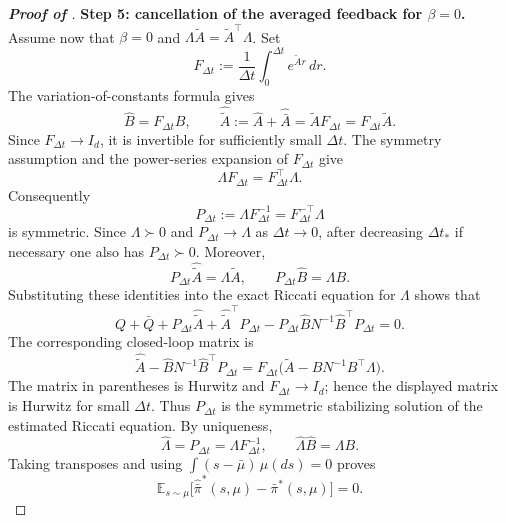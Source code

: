 \documentclass[a4paper, 10pt, english, reqno]{amsart}
\begin{document}
\begin{proof}[\textbf{Proof of }]
\textbf{Step 5: cancellation of the averaged feedback for $\beta=0$.}
Assume now that $\beta=0$ and
$\Lambda\widetilde A=\widetilde A^\top\Lambda$. Set
\[
F_{\Delta t}
:=
\frac1{\Delta t}\int_0^{\Delta t}e^{\widetilde A r}\,dr.
\]
The variation-of-constants formula gives
\[
\hat B=F_{\Delta t}B,
\qquad
\widehat{\widetilde A}:=\hat A+\hat{\bar A}
=\widetilde A F_{\Delta t}=F_{\Delta t}\widetilde A.
\]
Since $F_{\Delta t}\to I_d$, it is invertible for sufficiently small
$\Delta t$. The symmetry assumption and the power-series expansion of
$F_{\Delta t}$ give
\[
\Lambda F_{\Delta t}=F_{\Delta t}^\top\Lambda.
\]
Consequently
\[
P_{\Delta t}:=\Lambda F_{\Delta t}^{-1}
=F_{\Delta t}^{-\top}\Lambda
\]
is symmetric. Since $\Lambda\succ0$ and $P_{\Delta t}\to\Lambda$ as
$\Delta t\to0$, after decreasing $\Delta t_*$ if necessary one also has
$P_{\Delta t}\succ0$. Moreover,
\[
P_{\Delta t}\widehat{\widetilde A}=\Lambda\widetilde A,
\qquad
P_{\Delta t}\hat B=\Lambda B.
\]
Substituting these identities into the exact Riccati equation for
$\Lambda$ shows that
\[
Q+\bar Q
+P_{\Delta t}\widehat{\widetilde A}
+\widehat{\widetilde A}^{\top}P_{\Delta t}
-P_{\Delta t}\hat B N^{-1}\hat B^\top P_{\Delta t}=0.
\]
The corresponding closed-loop matrix is
\[
\widehat{\widetilde A}
-\hat B N^{-1}\hat B^\top P_{\Delta t}
=F_{\Delta t}
\bigl(\widetilde A-BN^{-1}B^\top\Lambda\bigr).
\]
The matrix in parentheses is Hurwitz and $F_{\Delta t}\to I_d$;
hence the displayed matrix is Hurwitz for small $\Delta t$. Thus
$P_{\Delta t}$ is the symmetric stabilizing solution of the estimated
Riccati equation. By uniqueness,
\[
\hat\Lambda=P_{\Delta t}=\Lambda F_{\Delta t}^{-1},
\qquad
\hat\Lambda\hat B=\Lambda B.
\]
Taking transposes and using
$\int(s-\bar\mu)\,\mu(ds)=0$ proves
\[
\mathbb E_{s\sim\mu}
\bigl[\widehat{\bar\pi}^*(s,\mu)-\bar\pi^*(s,\mu)\bigr]=0.
\]


\end{proof}
\end{document}
